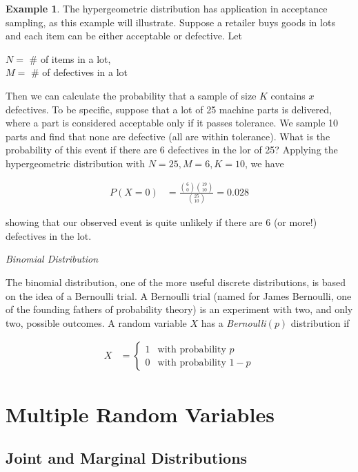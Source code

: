 \documentclass[11pt,a4paper]{report}
\theoremstyle{definition} \newtheorem{defn}{Definition}[section]
\theoremstyle{theorem} \newtheorem{thm}{Theorem}[section]
\theoremstyle{example} \newtheorem{ex}{Example}[section]
\begin{document}
\begin{ex} The hypergeometric distribution has application in
acceptance sampling, as this example will illustrate.  Suppose a
retailer buys goods in lots and each item can be either acceptable or
defective.  Let
  \begin{center} $N = $ # of items in a lot, \\ $M = $ # of defectives
in a lot
  \end{center}

Then we can calculate the probability that a sample of size $K$
contains $x$ defectives.  To be specific, suppose that a lot of 25
machine parts is delivered, where a part is considered acceptable only
if it passes tolerance.  We sample 10 parts and find that none are
defective (all are within tolerance).  What is the probability of this
event if there are 6 defectives in the lor of 25?  Applying the
hypergeometric distribution with $N=25, M=6, K=10$, we have

\begin{align*} P(X=0) &= \frac{{6 \choose 0}{19 \choose 10}}{{25
\choose 10}} = 0.028
\end{align*}

showing that our observed event is quite unlikely if there are 6 (or
more!) defectives in the lot.
\end{ex}

\textit{Binomial Distribution}

The binomial distribution, one of the more useful discrete
distributions, is based on the idea of a Bernoulli trial.  A Bernoulli
trial (named for James Bernoulli, one of the founding fathers of
probability theory) is an experiment with two, and only two, possible
outcomes.  A random variable $X$ has a \textit{Bernoulli}$(p)$
distribution if

\begin{align*} X &=
  \begin{cases} 1 & \text{with probability } p \\ 0 & \text{with
probability } 1-p
  \end{cases}
\end{align*}


\chapter{Multiple Random Variables}

\section{Joint and Marginal Distributions}
\end{document}
